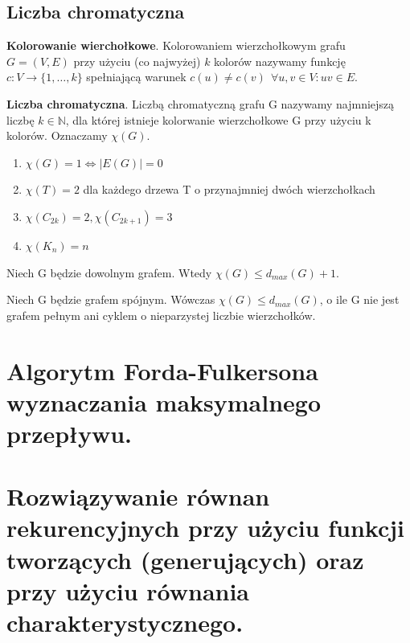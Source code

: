 \documentclass[12pt]{article}
\begin{document}
    \subsection{Liczba chromatyczna}
    \begin{definition}
        \textbf{Kolorowanie wierchołkowe}. Kolorowaniem wierzchołkowym grafu $G = (V, E)$ przy użyciu (co najwyżej) $k$
        kolorów nazywamy funkcję $c: V \rightarrow \{1, \dots, k\}$ spełniającą warunek
        $c(u) \neq c(v) ~~ \forall u, v \in V : uv \in E$.
    \end{definition}

    \begin{definition}
        \textbf{Liczba chromatyczna}. Liczbą chromatyczną grafu G nazywamy najmniejszą liczbę $k \in \mathbb{N}$, dla
        której istnieje kolorwanie wierzchołkowe G przy użyciu k kolorów. Oznaczamy $\chi(G)$.
        \begin{enumerate}
            \item $\chi(G) = 1 \Leftrightarrow |E(G)| = 0$
            \item $\chi(T) = 2$ dla każdego drzewa T o przynajmniej dwóch wierzchołkach
            \item $\chi(C_{2k}) = 2, \chi(C_{2k+1}) = 3$
            \item $\chi(K_n) = n$
        \end{enumerate}
    \end{definition}

    \begin{theorem}
        Niech G będzie dowolnym grafem. Wtedy $\chi(G) \leq d_{max}(G) + 1$.
    \end{theorem}

    \begin{theorem}
        Niech G będzie grafem spójnym. Wówczas $\chi(G) \leq d_{max}(G)$, o ile G nie jest grafem pełnym ani cyklem o
        nieparzystej liczbie wierzchołków.
    \end{theorem}

    \newpage

    \section{Algorytm Forda-Fulkersona wyznaczania maksymalnego przepływu.}
    \section{Rozwiązywanie równan rekurencyjnych przy użyciu funkcji tworzących (generujących) oraz przy użyciu równania charakterystycznego.}
\end{document}
